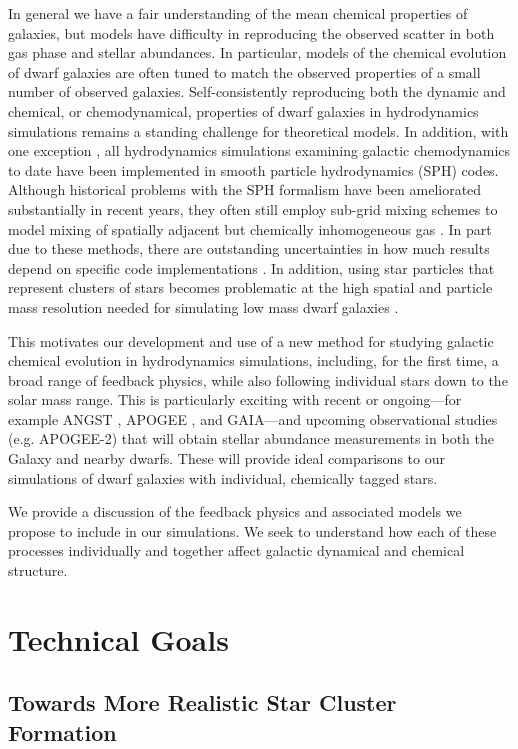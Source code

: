 \documentclass[11pt]{article}
\newcommand{\eg}{e.g.,}
\begin{document}
In general we have a fair understanding of the mean chemical properties of galaxies, but models have difficulty in reproducing the observed scatter in both gas phase and stellar abundances. In particular, models of the chemical evolution of dwarf galaxies are often tuned to match the observed properties of a small number of observed galaxies. Self-consistently reproducing both the dynamic and chemical, or chemodynamical, properties of dwarf galaxies in hydrodynamics simulations remains a standing challenge for theoretical models. In addition, with one exception \citep{Few2012, Few2014}, all hydrodynamics simulations examining galactic chemodynamics to date have been implemented in smooth particle hydrodynamics (SPH) codes. Although historical problems with the SPH formalism have been ameliorated substantially in recent years, they often still employ sub-grid mixing schemes to model mixing of spatially adjacent but chemically inhomogeneous gas \citep[\eg][]{ShenWadsleyStinson2010}. In part due to these methods, there are outstanding uncertainties in how much results depend on specific code implementations \citep{Revaz2016}. In addition, using star particles that represent clusters of stars becomes problematic at the high spatial and particle mass resolution needed for simulating low mass dwarf galaxies \citep{Revaz2016}. 

This motivates our development and use of a new method for studying galactic chemical evolution in hydrodynamics simulations, including, for the first time, a broad range of feedback physics, while also following individual stars down to the solar mass range. This is particularly exciting with recent or ongoing---for example ANGST \citep{ANGST2009}, APOGEE \citep{APOGEE2010}, and GAIA---and upcoming observational studies (e.g. APOGEE-2) that will obtain stellar abundance measurements in both the Galaxy and nearby dwarfs. These will provide ideal comparisons to our simulations of dwarf galaxies with individual, chemically tagged stars.

We provide a discussion of the feedback physics and associated models we propose to include in our simulations. We seek to understand how each of these processes individually and together affect galactic dynamical and chemical structure. 

\section{Technical Goals}

\subsection{Towards More Realistic Star Cluster Formation}
\end{document}
